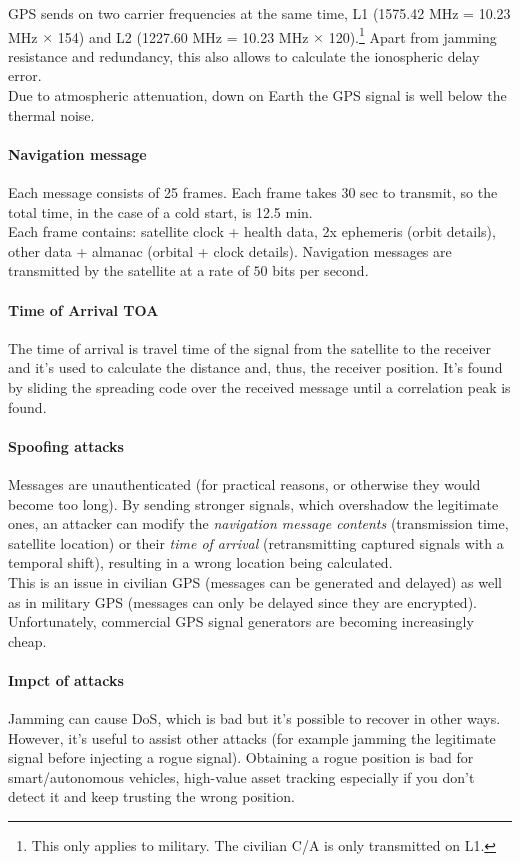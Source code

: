 GPS sends on two carrier frequencies at the same time, L1 (1575.42 MHz = 10.23
MHz $\times$ 154) and L2 (1227.60 MHz = 10.23 MHz $\times$ 120).\footnote{This
	only applies to military. The civilian C/A is only transmitted on L1.} Apart
from jamming resistance and redundancy, this also allows to calculate the
ionospheric delay error. \\ Due to atmospheric attenuation, down on Earth the
GPS signal is well below the thermal noise.%

\paragraph{Navigation message}
Each message consists of 25 frames. Each frame takes 30 sec to transmit, so the
total time, in the case of a cold start, is 12.5 min. \\ Each frame contains:
satellite clock + health data, 2x ephemeris (orbit details), other data +
almanac (orbital + clock details). Navigation messages are transmitted by the
satellite at a rate of $50$ bits per second.

\paragraph{Time of Arrival TOA}
The time of arrival is travel time of the signal from the satellite to the
receiver and it's used to calculate the distance and, thus, the receiver
position. It's found by sliding the spreading code over the received message
until a correlation peak is found.

\paragraph{Spoofing attacks}
Messages are unauthenticated (for practical reasons, or otherwise they would
become too long). By sending stronger signals, which overshadow the legitimate
ones, an attacker can modify the \textit{navigation message contents}
(transmission time, satellite location) or their \textit{time of arrival}
(retransmitting captured signals with a temporal shift), resulting in a wrong
location being calculated. \\ This is an issue in civilian GPS (messages can be
generated and delayed) as well as in military GPS (messages can only be delayed
since they are encrypted). Unfortunately, commercial GPS signal generators are
becoming increasingly cheap.

\paragraph{Impct of attacks}
Jamming can cause DoS, which is bad but it's possible to recover in other ways.
However, it's useful to assist other attacks (for example jamming the
legitimate signal before injecting a rogue signal). Obtaining a rogue position
is bad for smart/autonomous vehicles, high-value asset tracking especially if
you don't detect it and keep trusting the wrong position.
